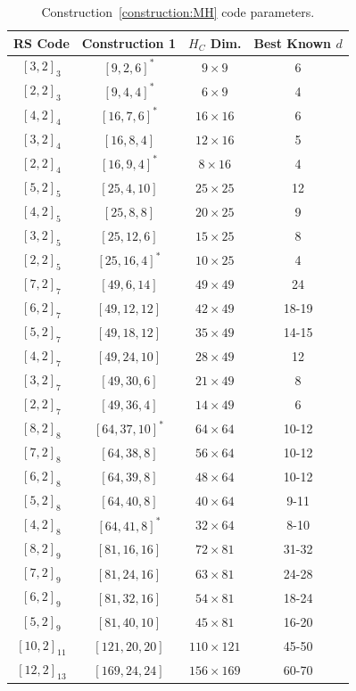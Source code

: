 \documentclass[11pt]{amsart}
\theoremstyle{definition}
\newcommand{\0}{\mathbf{0}}
\begin{document}
\begin{table}[htbp]
\caption{Construction~\ref{construction:MH} code parameters.}
\begin{center}
\begin{tabular}{|c|c|c|c|}
\hline
RS Code & Construction 1 & $H_C$ Dim. & Best Known $d$ \\ \hline
$[3,2]_3$ & $[9,2,6]^*$ & $9 \times 9$ & 6 \\
$[2,2]_3$ & $[9,4,4]^*$ & $6 \times 9$ & 4 \\
$[4,2]_4$ & $[16,7,6]^*$ & $16 \times 16$ & 6 \\
$[3,2]_4$ & $[16,8,4]$ & $12 \times 16$ & 5 \\
$[2,2]_4$ & $[16,9,4]^*$ & $8 \times 16$ & 4 \\
$[5,2]_5$ & $[25,4,10]$ & $25 \times 25$ & 12 \\
$[4,2]_5$ & $[25,8,8]$ & $20 \times 25$ & 9 \\
$[3,2]_5$ & $[25,12,6]$ & $15 \times 25$ & 8 \\
$[2,2]_5$ & $[25,16,4]^*$ & $10 \times 25$ & 4 \\
$[7,2]_7$ & $[49,6,14]$ & $49 \times 49$ & 24 \\
$[6,2]_7$ & $[49,12,12]$ & $42 \times 49$ & 18-19 \\
$[5,2]_7$ & $[49,18,12]$ & $35 \times 49$ & 14-15 \\
$[4,2]_7$ & $[49,24,10]$ & $28 \times 49$ & 12 \\
$[3,2]_7$ & $[49,30,6]$ & $21 \times 49$ & 8 \\
$[2,2]_7$ & $[49,36,4]$ & $14 \times 49$ & 6 \\
$[8,2]_8$ & $[64,37,10]^*$ & $64 \times 64$ & 10-12 \\
$[7,2]_8$ & $[64,38,8]$ & $56 \times 64$ & 10-12 \\
$[6,2]_8$ & $[64,39,8]$ & $48 \times 64$ & 10-12 \\
$[5,2]_8$ & $[64,40,8]$ & $40 \times 64$ & 9-11 \\
$[4,2]_8$ & $[64,41,8]^*$ & $32 \times 64$ & 8-10 \\
$[8,2]_9$ & $[81,16,16]$ & $72 \times 81$ & 31-32 \\
$[7,2]_9$ & $[81,24,16]$ & $63 \times 81$ & 24-28 \\
$[6,2]_9$ & $[81,32,16]$ & $54 \times 81$ & 18-24 \\
$[5,2]_9$ & $[81,40,10]$ & $45 \times 81$ & 16-20 \\ 
$[10,2]_{11}$ & $[121,20,20]$ & $110 \times 121$ & 45-50 \\ 
$[12,2]_{13}$ & $[169,24,24]$ & $156 \times 169$ & 60-70 \\
\hline
\end{tabular}
\label{tab:parameters}
\end{center}
\end{table}
\end{document}
